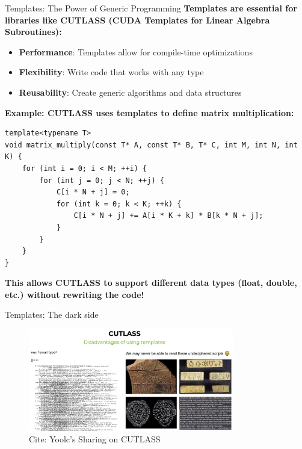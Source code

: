 \begin{frame}[fragile]{Templates: The Power of Generic Programming}
	\textbf{Templates are essential for libraries like CUTLASS (CUDA Templates for Linear Algebra Subroutines):}
	\begin{itemize}
		\item \textbf{Performance}: Templates allow for compile-time optimizations
		\item \textbf{Flexibility}: Write code that works with any type
		\item \textbf{Reusability}: Create generic algorithms and data structures
	\end{itemize}

	\textbf{Example: CUTLASS uses templates to define matrix multiplication:}
	\begin{verbatim}
template<typename T>
void matrix_multiply(const T* A, const T* B, T* C, int M, int N, int K) {
    for (int i = 0; i < M; ++i) {
        for (int j = 0; j < N; ++j) {
            C[i * N + j] = 0;
            for (int k = 0; k < K; ++k) {
                C[i * N + j] += A[i * K + k] * B[k * N + j];
            }
        }
    }
}
    \end{verbatim}

	\textbf{This allows CUTLASS to support different data types (float, double, etc.) without rewriting the code!}
\end{frame}

\begin{frame}[fragile]{Templates: The dark side}
	\begin{figure}
		\includegraphics[width=0.8\textwidth]{day8_pm/img/2-templates}
		\caption{Cite: Yoolc's Sharing on CUTLASS}
	\end{figure}
\end{frame}

